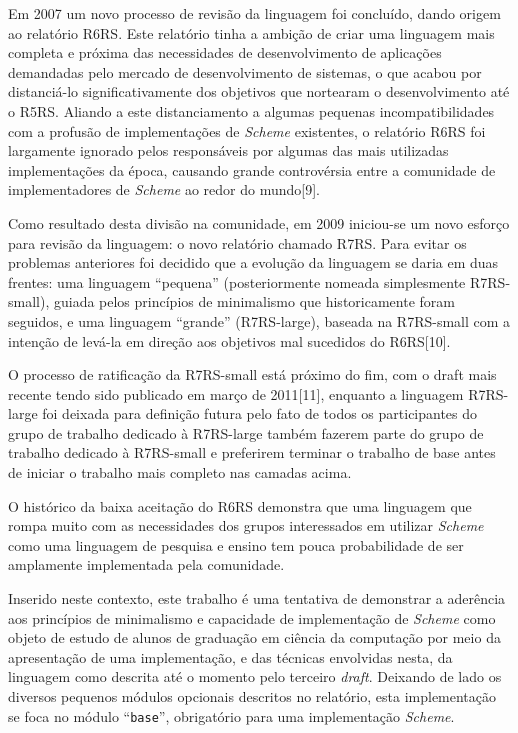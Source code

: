 Em 2007 um novo processo de revisão da linguagem foi concluído, dando origem ao
relatório \acs{R6RS}. Este relatório tinha a ambição de criar uma linguagem
mais completa e próxima das necessidades de desenvolvimento de aplicações
demandadas pelo mercado de desenvolvimento de sistemas, o que acabou por
distanciá-lo significativamente dos objetivos que nortearam o desenvolvimento
até o \acs{R5RS}. Aliando a este distanciamento a algumas pequenas
incompatibilidades com a profusão de implementações de \textit{Scheme}
existentes, o relatório \acs{R6RS} foi largamente ignorado pelos responsáveis
por algumas das mais utilizadas implementações da época, causando grande
controvérsia entre a comunidade de implementadores de \textit{Scheme} ao redor
do mundo[9].

Como resultado desta divisão na comunidade, em 2009 iniciou-se um novo esforço
para revisão da linguagem: o novo relatório chamado \acs{R7RS}. Para evitar os
problemas anteriores foi decidido que a evolução da linguagem se daria em duas
frentes: uma linguagem ``pequena'' (posteriormente nomeada simplesmente
\acs{R7RS}-small), guiada pelos princípios de minimalismo que historicamente
foram seguidos, e uma linguagem ``grande'' (\acs{R7RS}-large), baseada na
R7RS-small com a intenção de levá-la em direção aos objetivos mal sucedidos do
\acs{R6RS}[10]. 

O processo de ratificação da \acs{R7RS}-small está próximo do fim, com o draft
mais recente tendo sido publicado em março de 2011[11], enquanto a linguagem
\acs{R7RS}-large foi deixada para definição futura pelo fato de todos os
participantes do grupo de trabalho dedicado à \acs{R7RS}-large também fazerem
parte do grupo de trabalho dedicado à \acs{R7RS}-small e preferirem terminar o
trabalho de base antes de iniciar o trabalho mais completo nas camadas acima.

O histórico da baixa aceitação do \acs{R6RS} demonstra que uma linguagem que
rompa muito com as necessidades dos grupos interessados em utilizar
\textit{Scheme} como uma linguagem de pesquisa e ensino tem pouca probabilidade
de ser amplamente implementada pela comunidade.

Inserido neste contexto, este trabalho é uma tentativa de demonstrar a
aderência aos princípios de minimalismo e capacidade de implementação de
\textit{Scheme} como objeto de estudo de alunos de graduação em ciência da
computação por meio da apresentação de uma implementação, e das técnicas
envolvidas nesta, da linguagem como descrita até o momento pelo terceiro
\textit{draft}. Deixando de lado os diversos pequenos módulos opcionais
descritos no relatório, esta implementação se foca no módulo ``\texttt{base}'',
obrigatório para uma implementação \textit{Scheme}.


